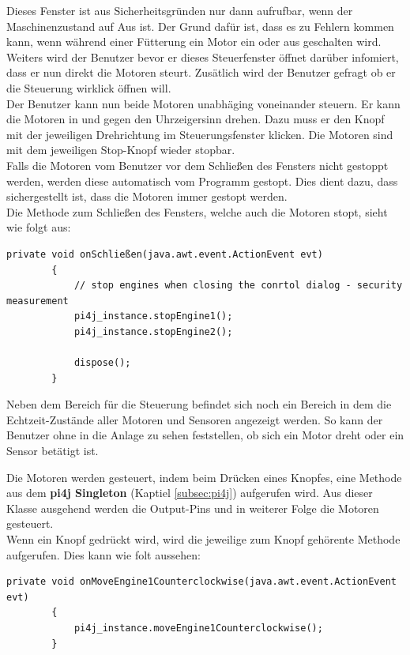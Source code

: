 Dieses Fenster ist aus Sicherheitsgründen nur dann aufrufbar, wenn der Maschinenzustand auf Aus ist. Der Grund dafür ist, dass es zu Fehlern kommen kann, wenn während einer Fütterung ein Motor ein oder aus geschalten wird.
\\ Weiters wird der Benutzer bevor er dieses Steuerfenster öffnet darüber infomiert, dass er nun direkt die Motoren steurt. Zusätlich wird der Benutzer gefragt ob er die Steuerung wirklick öffnen will.
\\ Der Benutzer kann nun beide Motoren unabhäging voneinander steuern. Er kann die Motoren in und gegen den Uhrzeigersinn drehen. Dazu muss er den Knopf mit der jeweiligen Drehrichtung im Steuerungsfenster klicken. Die Motoren sind mit dem jeweiligen Stop-Knopf wieder stopbar.
\\ Falls die Motoren vom Benutzer vor dem Schließen des Fensters nicht gestoppt werden, werden diese automatisch vom Programm gestopt. Dies dient dazu, dass sichergestellt ist, dass die Motoren immer gestopt werden.
\\ Die Methode zum Schließen des Fensters, welche auch die Motoren stopt, sieht wie folgt aus:
\begin{lstlisting}[style=JavaStyle, caption=Motoren stoppen und Fenster schließen]
	private void onSchließen(java.awt.event.ActionEvent evt)                                
    	{                                 
       		// stop engines when closing the conrtol dialog - security measurement
        	pi4j_instance.stopEngine1();
        	pi4j_instance.stopEngine2();
        
        	dispose();
    	} 
\end{lstlisting}

\vspace{10pt}

Neben dem Bereich für die Steuerung befindet sich noch ein Bereich in dem die Echtzeit-Zustände aller Motoren und Sensoren angezeigt werden. So kann der Benutzer ohne in die Anlage zu sehen feststellen, ob sich ein Motor dreht oder ein Sensor betätigt ist.

\vspace{10pt}

Die Motoren werden gesteuert, indem beim Drücken eines Knopfes, eine Methode aus dem \textbf{pi4j Singleton} (Kaptiel \ref{subsec:pi4j}) aufgerufen wird. Aus dieser Klasse ausgehend werden die Output-Pins und in weiterer Folge die Motoren gesteuert.
\\ Wenn ein Knopf gedrückt wird, wird die jeweilige zum Knopf gehörente Methode aufgerufen. Dies kann wie folt aussehen:
\begin{lstlisting}[style=JavaStyle, caption=Motoren drehen] 
	private void onMoveEngine1Counterclockwise(java.awt.event.ActionEvent evt)                                               
    	{                                                   
        	pi4j_instance.moveEngine1Counterclockwise();
    	}  
\end{lstlisting}

